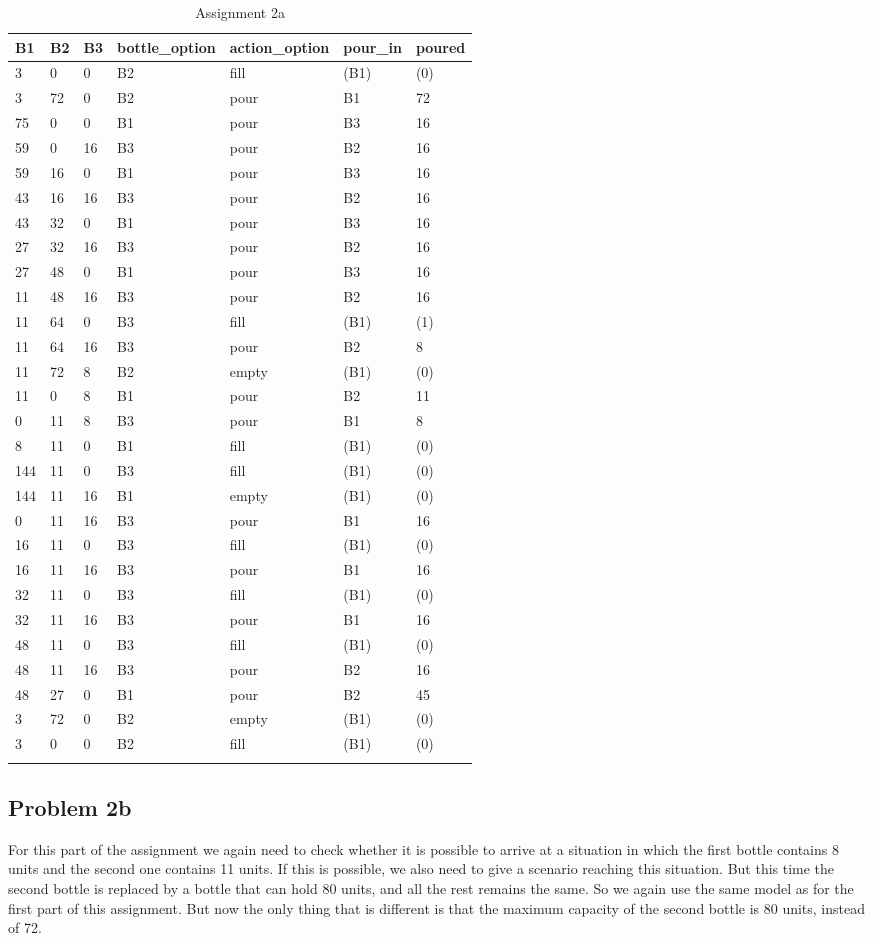 \documentclass[a4paper]{article}
\begin{document}
	\begin{longtable}[c]{@{}lllllll@{}}
		\toprule
		B1 & B2 & B3 & bottle\_option & action\_option & pour\_in &
		poured\tabularnewline
		\midrule
		\endhead
		3 & 0 & 0 & B2 & fill & (B1) & (0)\tabularnewline
		3 & 72 & 0 & B2 & pour & B1 & 72\tabularnewline
		75 & 0 & 0 & B1 & pour & B3 & 16\tabularnewline
		59 & 0 & 16 & B3 & pour & B2 & 16\tabularnewline
		59 & 16 & 0 & B1 & pour & B3 & 16\tabularnewline
		43 & 16 & 16 & B3 & pour & B2 & 16\tabularnewline
		43 & 32 & 0 & B1 & pour & B3 & 16\tabularnewline
		27 & 32 & 16 & B3 & pour & B2 & 16\tabularnewline
		27 & 48 & 0 & B1 & pour & B3 & 16\tabularnewline
		11 & 48 & 16 & B3 & pour & B2 & 16\tabularnewline
		11 & 64 & 0 & B3 & fill & (B1) & (1)\tabularnewline
		11 & 64 & 16 & B3 & pour & B2 & 8\tabularnewline
		11 & 72 & 8 & B2 & empty & (B1) & (0)\tabularnewline
		11 & 0 & 8 & B1 & pour & B2 & 11\tabularnewline
		0 & 11 & 8 & B3 & pour & B1 & 8\tabularnewline
		\rowcolor{Highlight}
		8 & 11 & 0 & B1 & fill & (B1) & (0)\tabularnewline
		144 & 11 & 0 & B3 & fill & (B1) & (0)\tabularnewline
		144 & 11 & 16 & B1 & empty & (B1) & (0)\tabularnewline
		0 & 11 & 16 & B3 & pour & B1 & 16\tabularnewline
		16 & 11 & 0 & B3 & fill & (B1) & (0)\tabularnewline
		16 & 11 & 16 & B3 & pour & B1 & 16\tabularnewline
		32 & 11 & 0 & B3 & fill & (B1) & (0)\tabularnewline
		32 & 11 & 16 & B3 & pour & B1 & 16\tabularnewline
		48 & 11 & 0 & B3 & fill & (B1) & (0)\tabularnewline
		48 & 11 & 16 & B3 & pour & B2 & 16\tabularnewline
		48 & 27 & 0 & B1 & pour & B2 & 45\tabularnewline
		3 & 72 & 0 & B2 & empty & (B1) & (0)\tabularnewline
		3 & 0 & 0 & B2 & fill & (B1) & (0)\tabularnewline
		\bottomrule
		\caption{Assignment 2a}
		\label{tab:2a}
	\end{longtable}
	
	\subsection*{Problem 2b}
	For this part of the assignment we again need to check whether it is possible to arrive at a situation in which the first bottle contains 8 units and the second one contains 11 units. If this is possible, we also need to give a scenario reaching this situation. But this time the second bottle is replaced by a bottle that can hold 80 units, and all the rest remains the same. So we again use the same model as for the first part of this assignment. But now the only thing that is different is that the maximum capacity of the second bottle is 80 units, instead of 72.\\
	
\end{document}
